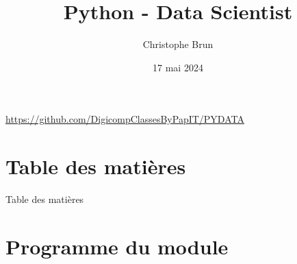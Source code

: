 \documentclass{beamer}
\title[PYDATA]{Python - Data Scientist}
\author{Christophe Brun}
\institute{Digicomp}
\date{17 mai 2024}
\begin{document}
    \begin{frame}
        \titlepage
        \bigbreak
        \centering
        \url{https://github.com/DigicompClassesByPapIT/PYDATA}
    \end{frame}


    \section{Table des matières}\label{sec:toc}

    \begin{frame}{Table des matières}
        \begin{small}
            \begin{multicols}{2}
                \tableofcontents
            \end{multicols}
        \end{small}
    \end{frame}


    \section{Programme du module}\label{sec:programme-du-module}
\end{document}
